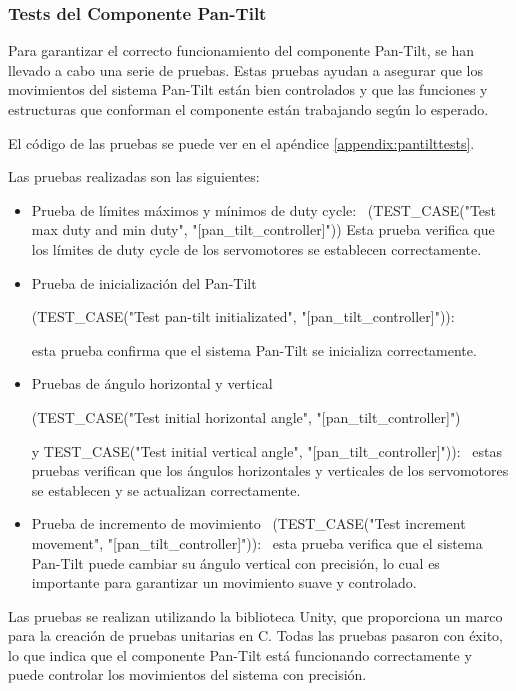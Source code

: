 \subsubsection{Tests del Componente Pan-Tilt}

Para garantizar el correcto funcionamiento del componente Pan-Tilt, se han llevado a cabo una serie de pruebas. Estas pruebas ayudan a asegurar que los movimientos del sistema Pan-Tilt están bien controlados y que las funciones y estructuras que conforman el componente están trabajando según lo esperado.



El código de las pruebas se puede ver en el apéndice \ref{appendix:pantilttests}.



Las pruebas realizadas son las siguientes:

\begin{itemize}

\item{Prueba de límites máximos y mínimos de duty cycle: 
\
(TEST\_CASE("Test max duty and min duty", "[pan\_tilt\_controller]")) 
Esta prueba verifica que los límites de duty cycle de los servomotores se establecen correctamente.
}
\item{ Prueba de inicialización del Pan-Tilt \

(TEST\_CASE("Test pan-tilt initializated", "[pan\_tilt\_controller]")): \

esta prueba confirma que el sistema Pan-Tilt se inicializa correctamente.
}
\item{ Pruebas de ángulo horizontal y vertical \

(TEST\_CASE("Test initial horizontal angle", "[pan\_tilt\_controller]") \

y TEST\_CASE("Test initial vertical angle", "[pan\_tilt\_controller]")): \
estas pruebas verifican que los ángulos horizontales y verticales de los servomotores se establecen y se actualizan correctamente.
}
\item{ Prueba de incremento de movimiento \
(TEST\_CASE("Test increment movement", "[pan\_tilt\_controller]")): \
esta prueba verifica que el sistema Pan-Tilt puede cambiar su ángulo vertical con precisión, lo cual es importante para garantizar un movimiento suave y controlado.
}
\end{itemize}


Las pruebas se realizan utilizando la biblioteca Unity, que proporciona un marco para la creación de pruebas unitarias en C. Todas las pruebas pasaron con éxito, lo que indica que el componente Pan-Tilt está funcionando correctamente y puede controlar los movimientos del sistema con precisión.

